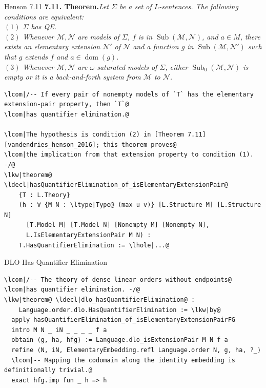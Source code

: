 \documentclass[aspectratio=169,11pt]{beamer}
\newcommand{\lcom}[1]{\textcolor{leanComment}{#1}}
\newcommand{\lkw}[1]{\textcolor{leanKeyword}{\textbf{#1}}}
\newcommand{\ldecl}[1]{\textcolor{leanDecl}{#1}}
\newcommand{\ltype}[1]{\textcolor{leanType}{#1}}
\newcommand{\lhole}[1]{\textcolor{leanHole}{#1}}
\begin{document}
\begin{frame}[fragile,t]{Henson 7.11}
\vspace{0.7em}
{\color{black}\rmfamily\fontsize{7.1}{8.2}\selectfont
{\bfseries 7.11. Theorem.}\quad \itshape Let \(\Sigma\) be a set of \(L\)-sentences.
The following conditions are equivalent:\\[0.2em]
\((1)\) \(\Sigma\) has QE.\\[0.2em]
\((2)\) Whenever \(\mathcal{M}, \mathcal{N}\) are models of \(\Sigma\),
\(f\) is in \(\operatorname{Sub}(\mathcal{M}, \mathcal{N})\), and \(a \in M\),
there exists an elementary extension \(\mathcal{N}'\) of \(\mathcal{N}\) and
a function \(g\) in \(\operatorname{Sub}(\mathcal{M}, \mathcal{N}')\) such that
\(g\) extends \(f\) and \(a \in \operatorname{dom}(g)\).\\[0.2em]
\((3)\) Whenever \(\mathcal{M}, \mathcal{N}\) are \(\omega\)-saturated models of
\(\Sigma\), either \(\operatorname{Sub}_0(\mathcal{M}, \mathcal{N})\) is empty
or it is a back-and-forth system from \(\mathcal{M}\) to \(\mathcal{N}\).
}

\vspace{0.35em}
\begin{Verbatim}[fontsize=\tiny,commandchars=\\\|\@]
\lcom|/-- If every pair of nonempty models of `T` has the elementary extension-pair property, then `T`@
\lcom|has quantifier elimination.@

\lcom|The hypothesis is condition (2) in [Theorem 7.11][vandendries_henson_2016]; this theorem proves@
\lcom|the implication from that extension property to condition (1). -/@
\lkw|theorem@ \ldecl|hasQuantifierElimination_of_isElementaryExtensionPair@
    {T : L.Theory}
    (h : ∀ {M N : \ltype|Type@ (max u v)} [L.Structure M] [L.Structure N]
      [T.Model M] [T.Model N] [Nonempty M] [Nonempty N],
      L.IsElementaryExtensionPair M N) :
    T.HasQuantifierElimination := \lhole|...@
\end{Verbatim}
\end{frame}

\begin{frame}[fragile]{DLO Has Quantifier Elimination}
\begin{Verbatim}[fontsize=\scriptsize,commandchars=\\\|\@]
\lcom|/-- The theory of dense linear orders without endpoints@
\lcom|has quantifier elimination. -/@
\lkw|theorem@ \ldecl|dlo_hasQuantifierElimination@ :
    Language.order.dlo.HasQuantifierElimination := \lkw|by@
  apply hasQuantifierElimination_of_isElementaryExtensionPairFG
  intro M N _ iN _ _ _ _ f a
  obtain ⟨g, ha, hfg⟩ := Language.dlo_isExtensionPair M N f a
  refine ⟨N, iN, ElementaryEmbedding.refl Language.order N, g, ha, ?_⟩
  \lcom|-- Mapping the codomain along the identity embedding is definitionally trivial.@
  exact hfg.imp fun _ h => h
\end{Verbatim}
\end{frame}
\end{document}
